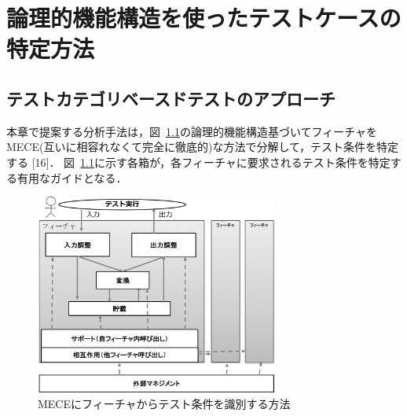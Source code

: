 \documentclass[a4paper,12pt]{jreport}
\begin{document}
\chapter{論理的機能構造を使ったテストケースの特定方法}


\section{テストカテゴリベースドテストのアプローチ}
本章で提案する分析手法は，図~\ref{fig:D-3-Fig3}の論理的機能構造基づいてフィーチャをMECE(互いに相容れなくて完全に徹底的)な方法で分解して，テスト条件を特定する [16]．
図~\ref{fig:D-3-Fig3}に示す各箱が，各フィーチャに要求されるテスト条件を特定する有用なガイドとなる．
\begin{figure}[h]
  \begin{center}
  \includegraphics[width=8cm]{./image/D-3-Fig3.png}
  \caption{MECEにフィーチャからテスト条件を識別する方法}
  \label{fig:D-3-Fig3}
  \end{center}
   \end{figure}
\end{document}
